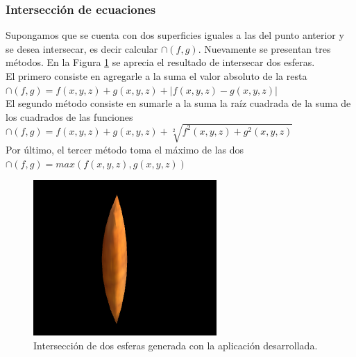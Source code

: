 \documentclass[12pt]{article}
\begin{document}
\subsubsection{Intersección de ecuaciones}
Supongamos que se cuenta con dos superficies iguales a las del punto anterior y se desea intersecar, es decir calcular $\cap(f,g)$. Nuevamente se presentan tres métodos. En la Figura  \ref{inter} se aprecia el resultado de intersecar dos esferas.
\\El primero consiste en agregarle a la suma el valor absoluto de la resta  $\cap(f,g)= f(x,y,z) + g(x,y,z)+ |f(x,y,z) - g(x,y,z)|$ 
\\El segundo método consiste en sumarle a la suma la raíz cuadrada de la suma de los cuadrados de las funciones   $\cap(f,g)= f(x,y,z) + g(x,y,z)+ \sqrt[2]{f^2(x,y,z) +g^2(x,y,z)}$ 
\\Por último, el tercer método toma el máximo de las dos   $\cap(f,g)= max(f(x,y,z) , g(x,y,z))$
\begin{figure}[h]
\includegraphics[width=0.7\linewidth,center]{oi2.png}
\caption{Intersección de dos esferas generada con la aplicación desarrollada.}
\label{inter}
\end{figure}
\end{document}
